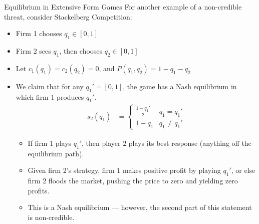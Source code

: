 \documentclass[8pt]{extarticle}
\begin{document}
\begin{problem}{Equilibrium in Extensive Form Games}
    For another example of a non-credible threat, consider Stackelberg Competition:
    \begin{itemize}
      \item Firm 1 chooses $q_1 \in [0,1]$
      \item Firm 2 sees $q_1$, then chooses $q_2\in[0,1]$
      \item Let $c_1(q_1) = c_2(q_2) = 0$, and $P(q_1,q_2) = 1-q_1-q_2$
      \item We claim that for any $q_1' = [0,1]$, the game has a Nash equilibrium in which firm 1 produces $q_1'$.
        \begin{align*}
          s_2(q_1) &= \begin{cases}
            \frac{1-q_1'}{2}&q_1=q_1'\\
            1-q_1 & q_1\neq q_1'
          \end{cases}
        \end{align*}
        \begin{itemize}
          \item If firm $1$ plays $q_1'$, then player $2$ plays its best response (anything off the equilibrium path).
          \item Given firm 2's strategy, firm $1$ makes positive profit by playing $q_1'$, or else firm $2$ floods the market, pushing the price to zero and yielding zero profits.
          \item This is a Nash equilibrium --- however, the second part of this statement is non-credible.
        \end{itemize}
    \end{itemize}
  \end{problem}
\end{document}
